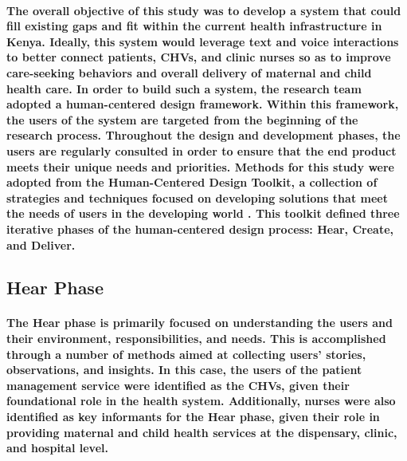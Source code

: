 \paragraph{The overall objective of this study was to develop a system that could fill existing gaps and fit within the current health infrastructure in Kenya. Ideally, this system would leverage text and voice interactions to better connect patients, CHVs, and clinic nurses so as to improve care-seeking behaviors and overall delivery of maternal and child health care. In order to build such a system, the research team adopted a human-centered design framework. Within this framework, the users of the system are targeted from the beginning of the research process. Throughout the design and development phases, the users are regularly consulted in order to ensure that the end product meets their unique needs and priorities. Methods for this study were adopted from the Human-Centered Design Toolkit, a collection of strategies and techniques focused on developing solutions that meet the needs of users in the developing world \citep{HCDToolkit}. This toolkit defined three iterative phases of the human-centered design process: Hear, Create, and Deliver. }

\subsection{Hear Phase}
\paragraph{The Hear phase is primarily focused on understanding the users and their environment, responsibilities, and needs. This is accomplished through a number of methods aimed at collecting users' stories, observations, and insights. In this case, the users of the patient management service were identified as the CHVs, given their foundational role in the health system. Additionally, nurses were also identified as key informants for the Hear phase, given their role in providing maternal and child health services at the dispensary, clinic, and hospital level.}

